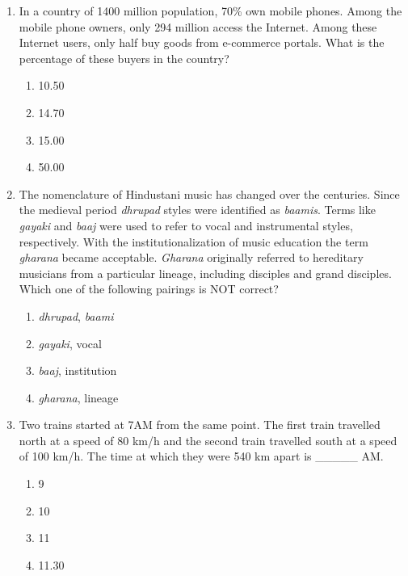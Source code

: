 \documentclass[article]{IEEEtran}
\numberwithin{figure}{enumi}
\begin{document}
\begin{enumerate}
    \item In a country of 1400 million population, 70\% own mobile phones. Among the mobile phone owners, only 294 million access the Internet. Among these Internet users, only half buy goods from e-commerce portals. What is the percentage of these buyers in the country?
    \begin{enumerate}
        \item 10.50
        \item 14.70
        \item 15.00
        \item 50.00
    \end{enumerate}
    
    \item The nomenclature of Hindustani music has changed over the centuries. Since the medieval period \textit{dhrupad} styles were identified as \textit{baamis}. Terms like \textit{gayaki} and \textit{baaj} were used to refer to vocal and instrumental styles, respectively. With the institutionalization of music education the term \textit{gharana} became acceptable. \textit{Gharana} originally referred to hereditary musicians from a particular lineage, including disciples and grand disciples. \\
    Which one of the following pairings is NOT correct?
    \begin{enumerate}
        \item \textit{dhrupad}, \textit{baami}
        \item \textit{gayaki}, vocal
        \item \textit{baaj}, institution
        \item \textit{gharana}, lineage
    \end{enumerate}
    
    \item Two trains started at 7AM from the same point. The first train travelled north at a speed of 80 km/h and the second train travelled south at a speed of 100 km/h. The time at which they were 540 km apart is \_\_\_\_\_ AM.
    \begin{enumerate}
        \item 9
        \item 10
        \item 11
        \item 11.30
    \end{enumerate}
    

\end{enumerate}
\end{document}

